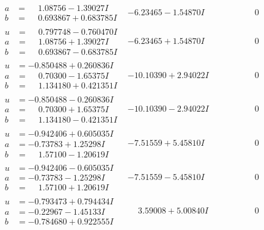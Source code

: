 \documentclass[1p]{elsarticle_modified}
\theoremstyle{definition}
\begin{document}
$$\begin{array}{c|c|c}
\begin{aligned}
a &= \phantom{-}1.08756 - 1.39027 I \\
b &= \phantom{-}0.693867 + 0.683785 I\end{aligned}
 & -6.23465 - 1.54870 I & \phantom{-0.000000 } 0 \\ \hline\begin{aligned}
u &= \phantom{-}0.797748 - 0.760470 I \\
a &= \phantom{-}1.08756 + 1.39027 I \\
b &= \phantom{-}0.693867 - 0.683785 I\end{aligned}
 & -6.23465 + 1.54870 I & \phantom{-0.000000 } 0 \\ \hline\begin{aligned}
u &= -0.850488 + 0.260836 I \\
a &= \phantom{-}0.70300 - 1.65375 I \\
b &= \phantom{-}1.134180 + 0.421351 I\end{aligned}
 & -10.10390 + 2.94022 I & \phantom{-0.000000 } 0 \\ \hline\begin{aligned}
u &= -0.850488 - 0.260836 I \\
a &= \phantom{-}0.70300 + 1.65375 I \\
b &= \phantom{-}1.134180 - 0.421351 I\end{aligned}
 & -10.10390 - 2.94022 I & \phantom{-0.000000 } 0 \\ \hline\begin{aligned}
u &= -0.942406 + 0.605035 I \\
a &= -0.73783 + 1.25298 I \\
b &= \phantom{-}1.57100 - 1.20619 I\end{aligned}
 & -7.51559 + 5.45810 I & \phantom{-0.000000 } 0 \\ \hline\begin{aligned}
u &= -0.942406 - 0.605035 I \\
a &= -0.73783 - 1.25298 I \\
b &= \phantom{-}1.57100 + 1.20619 I\end{aligned}
 & -7.51559 - 5.45810 I & \phantom{-0.000000 } 0 \\ \hline\begin{aligned}
u &= -0.793473 + 0.794434 I \\
a &= -0.22967 - 1.45133 I \\
b &= -0.784680 + 0.922555 I\end{aligned}
 & \phantom{-}3.59008 + 5.00840 I & \phantom{-0.000000 } 0 \\ \hline\begin{aligned}

\end{aligned}
\end{array}$$
\end{document}
